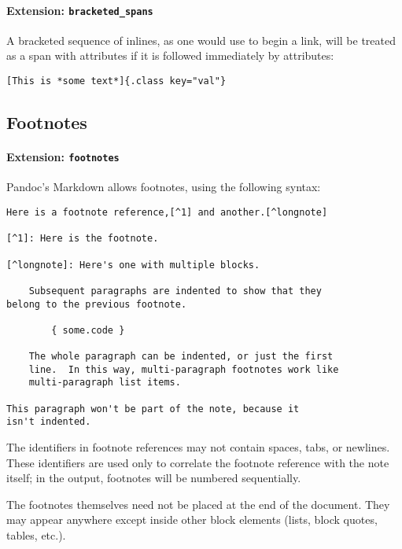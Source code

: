 \documentclass[]{article}
\let\oldparagraph\paragraph
\renewcommand{\paragraph}[1]{\oldparagraph{#1}\mbox{}}
\begin{document}
\paragraph{\texorpdfstring{Extension:
\texttt{bracketed\_spans}}{Extension: bracketed\_spans}}\label{extension-bracketed_spans}

A bracketed sequence of inlines, as one would use to begin a link, will
be treated as a span with attributes if it is followed immediately by
attributes:

\begin{verbatim}
[This is *some text*]{.class key="val"}
\end{verbatim}

\hypertarget{footnotes}{\subsection{Footnotes}\label{footnotes}}

\paragraph{\texorpdfstring{Extension:
\texttt{footnotes}}{Extension: footnotes}}\label{extension-footnotes}

Pandoc's Markdown allows footnotes, using the following syntax:

\begin{verbatim}
Here is a footnote reference,[^1] and another.[^longnote]

[^1]: Here is the footnote.

[^longnote]: Here's one with multiple blocks.

    Subsequent paragraphs are indented to show that they
belong to the previous footnote.

        { some.code }

    The whole paragraph can be indented, or just the first
    line.  In this way, multi-paragraph footnotes work like
    multi-paragraph list items.

This paragraph won't be part of the note, because it
isn't indented.
\end{verbatim}

The identifiers in footnote references may not contain spaces, tabs, or
newlines. These identifiers are used only to correlate the footnote
reference with the note itself; in the output, footnotes will be
numbered sequentially.

The footnotes themselves need not be placed at the end of the document.
They may appear anywhere except inside other block elements (lists,
block quotes, tables, etc.).
\end{document}
